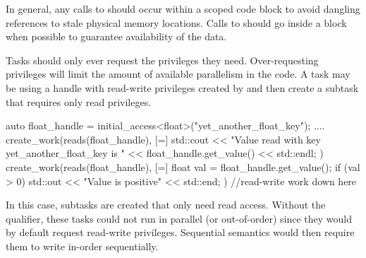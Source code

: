 In general, any calls to  should occur 
within a scoped code block to avoid dangling references to stale physical memory locations.
Calls to  should go inside a  block when possible 
to guarantee availability of the data.

Tasks should only ever request the privileges they need. 
Over-requesting privileges will limit the amount of available parallelism in the code.
A task may be using a handle with read-write privileges created by 
and then create a subtask that requires only read privileges.

\begin{CppCode}
auto float_handle = initial_access<float>("yet_another_float_key");
....
create_work(reads(float_handle), [=] {
  std::cout << "Value read with key yet_another_float_key is " 
          << float_handle.get_value() << std::endl;
})
create_work(reads(float_handle), [=] {
  float val = float_handle.get_value();
  if (val > 0) std::out << "Value is positive" << std::end;
})
//read-write work down here
\end{CppCode}
In this case, subtasks are created that only need read access. 
Without the  qualifier, these tasks could not run in parallel (or out-of-order) since they
would by default request read-write privileges.
Sequential semantics would then require them to write in-order sequentially.

